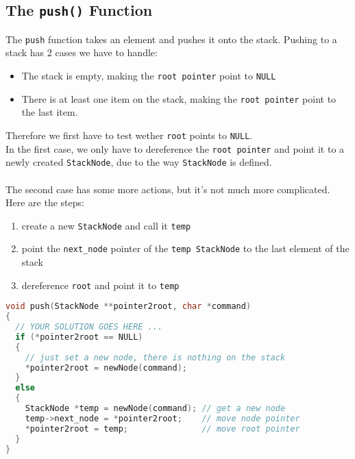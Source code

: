 \documentclass[a4paper, 11pt]{article}
\begin{document}
    \subsection{The \texttt{push()} Function}
    The \texttt{push} function takes an element and pushes it onto the stack.
    Pushing to a stack has 2 cases we have to handle:
    \begin{itemize}
        \item The stack is empty, making the \texttt{root pointer} point to \texttt{NULL}
        \item There is at least one item on the stack, making the \texttt{root pointer} point to the last item.
    \end{itemize}
    Therefore we first have to test wether \texttt{root} points to \texttt{NULL}.
    \\
    In the first case, we only have to dereference the \texttt{root pointer} and point it to a newly created 
    \texttt{StackNode}, due to the way \texttt{StackNode} is defined.
    \\\\
    The second case has some more actions, but it's not much more complicated. Here are the steps:
    \begin{enumerate}
        \item create a new \texttt{StackNode} and call it \texttt{temp}
        \item point the \texttt{next\_node} pointer of the \texttt{temp StackNode} to the 
              last element of the stack
        \item dereference \texttt{root} and point it to \texttt{temp}
    \end{enumerate}
    \begin{lstlisting}[language=C,caption={The \texttt{push()} Function},label={push}]
void push(StackNode **pointer2root, char *command)
{
  // YOUR SOLUTION GOES HERE ...
  if (*pointer2root == NULL)
  {
    // just set a new node, there is nothing on the stack
    *pointer2root = newNode(command); 
  }
  else
  {
    StackNode *temp = newNode(command); // get a new node
    temp->next_node = *pointer2root;    // move node pointer
    *pointer2root = temp;               // move root pointer
  }
}
    \end{lstlisting}
\end{document}
